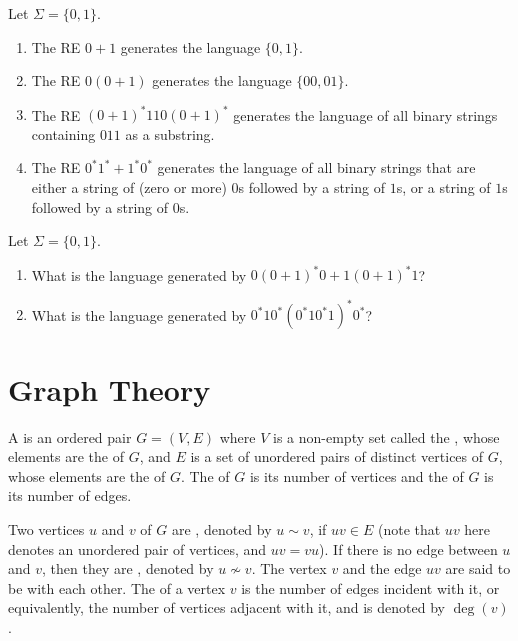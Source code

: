 \begin{Example} Let $\Sigma = \{0, 1\}$.
\begin{enumerate}
\item The RE $0 + 1$ generates the language $\{0, 1\}$.
\item The RE $0(0 + 1)$ generates the language $\{00, 01\}$.
\item The RE $(0 + 1)^*110(0 + 1)^*$ generates the language of all binary strings containing $011$ as a substring.
\item The RE $0^* 1^* + 1^* 0^*$ generates the language of all binary strings that are either a string of (zero or more) $0$s followed by a string of $1$s, or a string of $1$s followed by a string of $0$s.
\end{enumerate}
\end{Example}

\begin{Exercise} Let $\Sigma = \{0, 1\}$.
\begin{enumerate}
\item What is the language generated by $0 (0 + 1)^* 0 + 1 (0 + 1)^* 1$?
\item What is the language generated by $0^* 1 0^*(0^* 1 0^* 1)^* 0^*$?
\end{enumerate}
\end{Exercise}


\clearpage

\section{Graph Theory}\label{sec:GraphTheory}

A  is an ordered pair $G = (V, E)$ where $V$ is a non-empty set called the , whose elements are the  of $G$, and $E$ is a set of unordered pairs of distinct vertices of $G$, whose elements are the  of $G$. The  of $G$ is its number of vertices and the  of $G$ is its number of edges.

Two vertices $u$ and $v$ of $G$ are , denoted by $u \sim v$, if $uv \in E$ (note that $uv$ here denotes an unordered pair of vertices, and $uv = vu$). If there is no edge between $u$ and $v$, then they are , denoted by $u \nsim v$. The vertex $v$ and the edge $uv$ are said to be  with each other. The  of a vertex $v$ is the number of edges incident with it, or equivalently, the number of vertices adjacent with it, and is denoted by $\deg(v)$.

